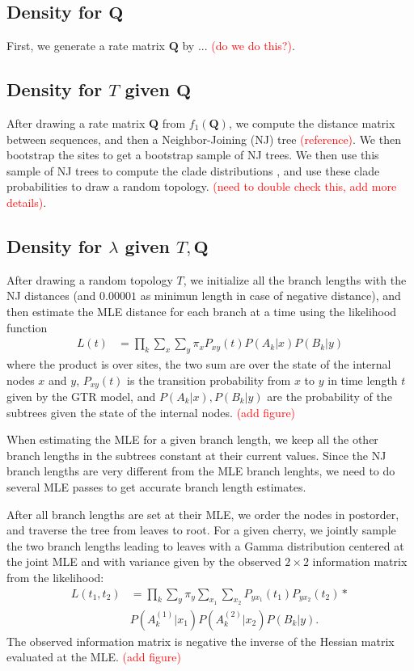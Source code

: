\documentclass[conference]{IEEEtran}
\newcommand{\falta}[1]{\textcolor{red}{#1}}
\begin{document}
\subsection*{Density for $\mathbf{Q}$}
First, we generate a rate matrix $\mathbf{Q}$ by ... \falta{(do we do this?)}.

\subsection*{Density for $T$ given $\mathbf{Q}$}
After drawing a rate matrix $\mathbf{Q}$ from $f_1(\mathbf{Q})$, we
compute the distance matrix between sequences, and then a
Neighbor-Joining (NJ) tree \falta{(reference)}. We then bootstrap the
sites to get a bootstrap sample of NJ trees. We then use this sample
of NJ trees to compute the clade distributions \citep{Larget2013}, and
use these clade probabilities to draw a random topology.
\falta{(need to double check this, add more details)}.

\subsection*{Density for $\lambda$ given $T,\mathbf{Q}$}
After drawing a random topology $T$, we initialize all the branch
lengths with the NJ distances (and $0.00001$ as minimun length in case
of negative distance), and then estimate the MLE distance for each
branch at a time using the likelihood function
\begin{align*}
L(t) &= \prod_k \sum_x \sum_y \pi_x P_{xy}(t)P(A_k|x)P(B_k|y)
\end{align*}
where the product is over sites, the two sum are over the state of the
internal nodes $x$ and $y$, $P_{xy}(t)$ is the transition probability
from $x$ to $y$ in time length $t$ given by the GTR model, and
$P(A_k|x), P(B_k|y)$ are the probability of the subtrees given the
state of the internal nodes. \falta{(add figure)}

When estimating the MLE for a given branch length, we keep all the
other branch lengths in the subtrees constant at their current
values. Since the NJ branch lengths are very different from the MLE
branch lenghts, we need to do several MLE passes to get accurate
branch length estimates.

After all branch lengths are set at their MLE, we order the nodes in
postorder, and traverse the tree from leaves to root. For a given
cherry, we jointly sample the two branch lengths leading to leaves
with a Gamma distribution centered at the joint MLE and with variance
given by the observed $2 \times 2$ information matrix from the
likelihood:
\begin{align*}
L(t_1,t_2) &= \prod_k \sum_y \pi_y \sum_{x_1} \sum_{x_2}
P_{yx_1}(t_1)P_{yx_2}(t_2) * \\
&P(A^{(1)}_k|x_1)P(A^{(2)}_k|x_2)P(B_k|y).
\end{align*}
The observed information matrix is negative the inverse of the Hessian
matrix evaluated at the MLE.
\falta{(add figure)}
\end{document}
